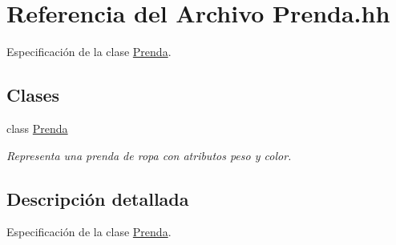 \hypertarget{_prenda_8hh}{}\section{Referencia del Archivo Prenda.\+hh}
\label{_prenda_8hh}


Especificación de la clase \hyperlink{class_prenda}{Prenda}.  


\subsection*{Clases}
\begin{DoxyCompactItemize}
\item 
class \hyperlink{class_prenda}{Prenda}
\begin{DoxyCompactList}\small\item\em Representa una prenda de ropa con atributos peso y color. \end{DoxyCompactList}\end{DoxyCompactItemize}


\subsection{Descripción detallada}
Especificación de la clase \hyperlink{class_prenda}{Prenda}. 

